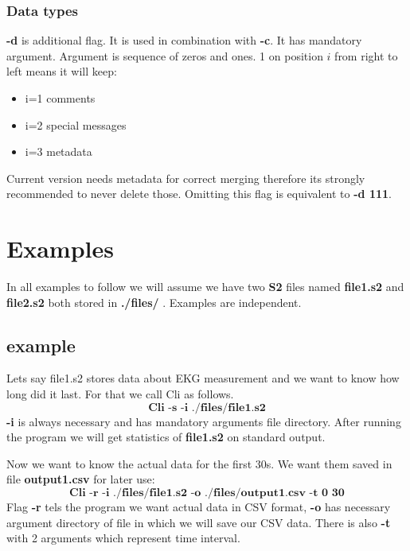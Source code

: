 \documentclass[english]{article}
\begin{document}
\subsubsection{Data types}
\textbf{-d} is additional flag. It is used in combination with \textbf{-c}.  It has mandatory argument. Argument is sequence of zeros and ones. 1 on position $i$ from right to left means it will keep:
 \begin{itemize}
\item i=1 comments
\item i=2 special messages
\item i=3 metadata
\end{itemize}
Current version needs metadata for correct merging therefore its strongly recommended to never delete those.
Omitting this flag is equivalent to \textbf{-d 111}.

\section{Examples}

In all examples to follow we will assume we have two \textbf{S2} files named \textbf{file1.s2} and \textbf{file2.s2} both stored in \textbf{./files/} . Examples are independent.


\subsection{example}
Lets say file1.s2 stores data about EKG measurement and we want to know how long did it last. For that we call Cli as follows. $$\textbf{Cli -s -i ./files/file1.s2} $$
 \textbf{-i} is always necessary and has mandatory arguments file directory. After running the program we will get statistics of \textbf{file1.s2} on standard output.

Now we want to know the actual data for the first 30s. We want them saved in file \textbf{output1.csv} for later use: $$ \textbf{Cli -r -i ./files/file1.s2 -o ./files/output1.csv -t 0 30} $$
Flag \textbf{-r} tels the program we want actual data in CSV format, \textbf{-o} has necessary argument directory of file in which we will save our CSV data. There is also \textbf{-t} with 2 arguments which represent time interval.
\end{document}

